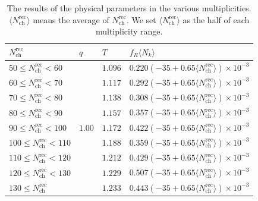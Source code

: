 \documentclass[jkps,fleqn,showpacs,showkeys]{revtex4}
\begin{document}
\begin{table}[ht]
  \renewcommand{\arraystretch}{1.5}
  \begin{tabular}{C{3cm} | C{1.5cm} | C{1.5cm} | C{6cm}}
  \hline
  $N_{\text{ch}}^{\text{rec}}$         &  $q$   &   $T$   & $f_R\langle N_k \rangle$ \\ \hline\hline
  $50\leq N_{\text{ch}}^{\text{rec}}<60$   &        & $1.096$ & $0.220(-35+0.65\langle N_{\text{ch}}^{\text{rec}}\rangle)\times10^{-3}$ \\   
  $60\leq N_{\text{ch}}^{\text{rec}}<70$   &        & $1.117$ & $0.292(-35+0.65\langle N_{\text{ch}}^{\text{rec}}\rangle)\times10^{-3}$ \\   
  $70\leq N_{\text{ch}}^{\text{rec}}<80$   &        & $1.138$ & $0.308(-35+0.65\langle N_{\text{ch}}^{\text{rec}}\rangle)\times10^{-3}$ \\   
  $80\leq N_{\text{ch}}^{\text{rec}}<90$   &        & $1.157$ & $0.357(-35+0.65\langle N_{\text{ch}}^{\text{rec}}\rangle)\times10^{-3}$ \\   
  $90\leq N_{\text{ch}}^{\text{rec}}<100$  & $1.00$ & $1.172$ & $0.422(-35+0.65\langle N_{\text{ch}}^{\text{rec}}\rangle)\times10^{-3}$ \\   
  $100\leq N_{\text{ch}}^{\text{rec}}<110$ &        & $1.188$ & $0.359(-35+0.65\langle N_{\text{ch}}^{\text{rec}}\rangle)\times10^{-3}$ \\   
  $110\leq N_{\text{ch}}^{\text{rec}}<120$ &        & $1.212$ & $0.429(-35+0.65\langle N_{\text{ch}}^{\text{rec}}\rangle)\times10^{-3}$ \\   
  $120\leq N_{\text{ch}}^{\text{rec}}<130$ &        & $1.229$ & $0.507(-35+0.65\langle N_{\text{ch}}^{\text{rec}}\rangle)\times10^{-3}$ \\   
  $130\leq N_{\text{ch}}^{\text{rec}}$     &        & $1.233$ & $0.443(-35+0.65\langle N_{\text{ch}}^{\text{rec}}\rangle)\times10^{-3}$ \\ \hline
  \end{tabular}
  \caption{The results of the physical parameters in the various multiplicities.
  $\langle N_{\text{ch}}^{\text{rec}}\rangle$ means the average of $N_{\text{ch}}^{\text{rec}}$.
  We set $\langle N_{\text{ch}}^{\text{rec}}\rangle$ as the half of each multiplicity range.
  }
  \label{table:variousmulti}
\end{table}
\end{document}
